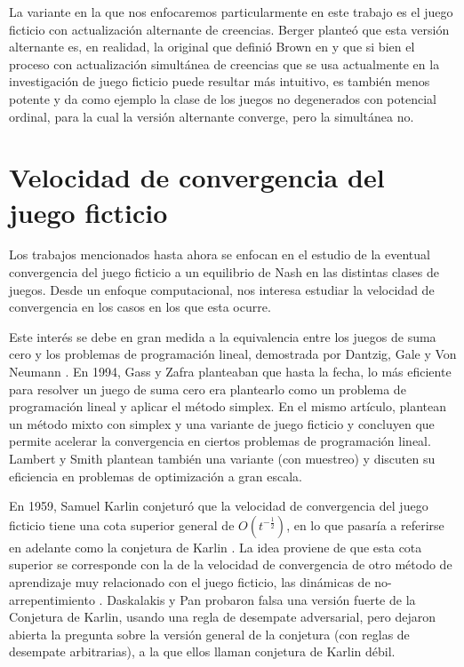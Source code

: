La variante en la que nos enfocaremos particularmente en este trabajo es el juego ficticio con actualización alternante de creencias. Berger \cite{browns:original} planteó que esta versión alternante es, en realidad, la original que definió Brown en \cite{brown:1951} y que si bien el proceso con actualización simultánea de creencias que se usa actualmente en la investigación de juego ficticio puede resultar más intuitivo, es también menos potente y da como ejemplo la clase de los juegos no degenerados con potencial ordinal, para la cual la versión alternante converge, pero la simultánea no.

\section{Velocidad de convergencia del juego ficticio}

Los trabajos mencionados hasta ahora se enfocan en el estudio de la eventual convergencia del juego ficticio a un equilibrio de Nash en las distintas clases de juegos. Desde un enfoque computacional, nos interesa estudiar la velocidad de convergencia en los casos en los que esta ocurre.

Este interés se debe en gran medida a la equivalencia entre los juegos de suma cero y los problemas de programación lineal, demostrada por Dantzig, Gale y Von Neumann \cite{fplp:equiv, programming:game:equivalence}. En 1994, Gass y Zafra \cite{modified:fp:linear} planteaban que hasta la fecha, lo más eficiente para resolver un juego de suma cero era plantearlo como un problema de programación lineal y aplicar el método simplex. En el mismo artículo, plantean un método mixto con simplex y una variante de juego ficticio y concluyen que permite acelerar la convergencia en ciertos problemas de programación lineal. Lambert y Smith \cite{aproach:large:scale} plantean también una variante (con muestreo) y discuten su eficiencia en problemas de optimización a gran escala.

En 1959, Samuel Karlin conjeturó que la velocidad de convergencia del juego ficticio tiene una cota superior general de $O(t^{-\frac{1}{2}})$, en lo que pasaría a referirse en adelante como la conjetura de Karlin \cite{karlin:conjecture}. La idea proviene de que esta cota superior se corresponde con la de la velocidad de convergencia de otro método de aprendizaje muy relacionado con el juego ficticio, las dinámicas de no-arrepentimiento \cite{no:regret}. Daskalakis y Pan \cite{counter:karlin:strong} probaron falsa una versión fuerte de la Conjetura de Karlin, usando una regla de desempate adversarial, pero dejaron abierta la pregunta sobre la versión general de la conjetura (con reglas de desempate arbitrarias), a la que ellos llaman conjetura de Karlin débil.

